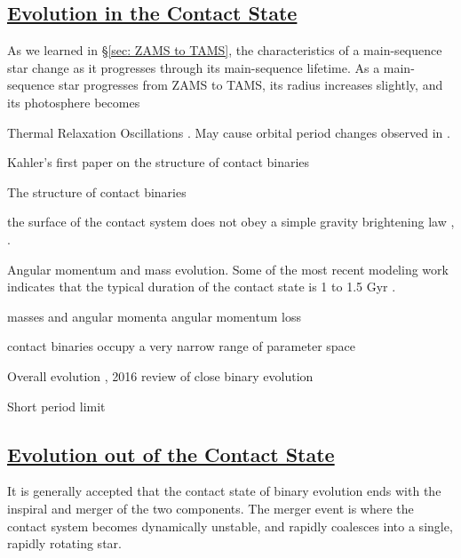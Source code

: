 \documentclass[12pt]{article} %
\numberwithin{equation}{section} %
\begin{document}
\subsection[Evolution in the Contact State]{\hyperlink{toc}{Evolution in the Contact State}}

As we learned in \S\ref{sec: ZAMS to TAMS}, the characteristics of a main-sequence star change as it progresses through its main-sequence lifetime. As a main-sequence star progresses from ZAMS to TAMS, its radius increases slightly, and its photosphere becomes  

Thermal Relaxation Oscillations \citep{wang1994thermal}. May cause orbital period changes observed in \citet{qian2001orbital}.

Kahler's first paper on the structure of contact binaries \citep{kahler2002structure}

The structure of contact binaries \citep{kahler2004structure}

the surface of the contact system does not obey a simple gravity brightening law \citep{kahler2004structure}, \citep{hilditch1988evolutionary}.

\citep{rubenstein2001effect}

Angular momentum and mass evolution. Some of the most recent modeling work indicates that the typical duration of the contact state is 1 to 1.5 Gyr \citep{gazeas2008angular}.

masses and angular momenta \citep{gazeas2006masses} angular momentum loss \citep{vilhu1981contact}

contact binaries occupy a very narrow range of parameter space \citep{gazeas2009physical} \citep{awadalla2005absolute}

Overall evolution \citep{stepien2008evolutionary}, 2016 review of close binary evolution \citep{tutukov2016evolution}

Short period limit \citep{rucinski2007short} \citep{drake2014ultra} \cite{lohr2012period} \citep{rucinski1992can}

\subsection[Evolution out of the Contact State]{\hyperlink{toc}{Evolution out of the Contact State}}

It is generally accepted that the contact state of binary evolution ends with the inspiral and merger of the two components. The merger event is where the contact system becomes dynamically unstable, and rapidly coalesces into a single, rapidly rotating star. 
\end{document}
